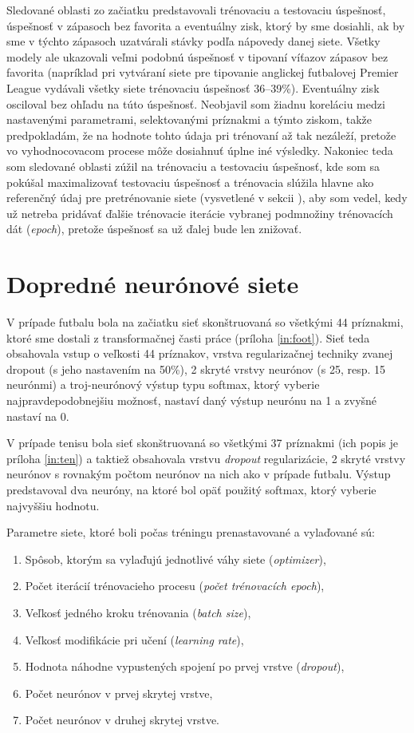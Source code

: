 Sledované oblasti zo začiatku predstavovali trénovaciu a testovaciu úspešnosť, úspešnosť v zápasoch bez favorita a eventuálny zisk, ktorý by sme dosiahli, ak by sme v týchto zápasoch uzatvárali stávky podľa nápovedy danej siete. 
Všetky modely ale ukazovali veľmi podobnú úspešnosť v tipovaní víťazov zápasov bez favorita (napríklad pri vytváraní siete pre tipovanie anglickej futbalovej Premier League vydávali všetky siete trénovaciu úspešnosť 36--39\%).
Eventuálny zisk osciloval bez ohľadu na túto úspešnosť.
Neobjavil som žiadnu koreláciu medzi nastavenými parametrami, selektovanými príznakmi a týmto ziskom, takže predpokladám, že na hodnote tohto údaja pri trénovaní až tak nezáleží, pretože vo vyhodnocovacom procese môže dosiahnuť úplne iné výsledky.
Nakoniec teda som sledované oblasti zúžil na trénovaciu a testovaciu úspešnosť, kde som sa pokúšal maximalizovať testovaciu úspešnosť a trénovacia slúžila hlavne ako referenčný údaj pre pretrénovanie siete (vysvetlené v sekcii \citep{overfit}), aby som vedel, kedy už netreba pridávať ďalšie trénovacie iterácie vybranej podmnožiny trénovacích dát (\textit{epoch}), pretože úspešnosť sa už ďalej bude len znižovať.

\section{Dopredné neurónové siete}
V prípade futbalu bola na začiatku sieť skonštruovaná so všetkými 44 príznakmi, ktoré sme dostali z transformačnej časti práce (príloha \ref{in:foot}).
Sieť teda obsahovala vstup o veľkosti 44 príznakov, vrstva regularizačnej techniky zvanej dropout (s jeho nastavením na 50\%), 2 skryté vrstvy neurónov (s 25, resp. 15 neurónmi) a troj-neurónový výstup typu softmax, ktorý vyberie najpravdepodobnejšiu možnosť, nastaví daný výstup neurónu na 1 a zvyšné nastaví na 0.

V prípade tenisu bola sieť skonštruovaná so všetkými 37 príznakmi (ich popis je príloha \ref{in:ten}) a taktiež obsahovala vrstvu \textit{dropout} regularizácie, 2 skryté vrstvy neurónov s rovnakým počtom neurónov na nich ako v prípade futbalu. 
Výstup predstavoval dva neuróny, na ktoré bol opäť použitý softmax, ktorý vyberie najvyššiu hodnotu.

Parametre siete, ktoré boli počas tréningu prenastavované a vylaďované sú:
\begin{enumerate}
  \item Spôsob, ktorým sa vylaďujú jednotlivé váhy siete (\textit{optimizer}),
  \item Počet iterácií trénovacieho procesu (\textit{počet trénovacích epoch}),
  \item Veľkosť jedného kroku trénovania (\textit{batch size}),
  \item Veľkosť modifikácie pri učení (\textit{learning rate}),
  \item Hodnota náhodne vypustených spojení po prvej vrstve (\textit{dropout}),
  \item Počet neurónov v prvej skrytej vrstve,
  \item Počet neurónov v druhej skrytej vrstve.
\end{enumerate}

